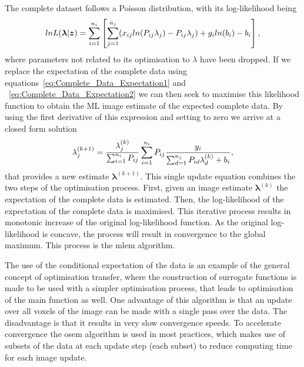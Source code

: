 The complete dataset follows a Poisson distribution, with its log-likelihood being
\begin{equation}
lnL(\bm{\lambda}|\bm{z}) = 
\sum_{i=1}^{n_i} \left[\sum_{j=1}^{n_j}( x_{ij} ln(P_{ij}\lambda_j) - P_{ij} \lambda_j) +
g_i ln(b_i) - b_i \right] \\ ,  
\label{eqn:log_likelihood_z}
\end{equation}
where parameters not related to its optimisation to $\lambda$ have been dropped. 
If we replace the expectation of the complete data using equations~\ref{eq:Complete_Data_Expectation1} and ~\ref{eq:Complete_Data_Expectation2} we can then seek to maximise this likelihood function to obtain the ML image estimate of the expected complete data. By using the first derivative of this expression and setting to zero we arrive at a closed form solution
\begin{equation}
\lambda_j^{(k+1)} = \frac{\lambda_j^{(k)}}{\sum_{i=1}^{n_i} P_{ij}} 
\sum_{i=1}^{n_i} P_{ij} 
\frac{y_i}{\sum_{d=1}^{n_j} P_{id}\lambda_d^{(k)} + b_i } \\,
\label{eqn:MLEM}
\end{equation} 
that provides a new estimate $\bm{\lambda}^{(k+1)}$. This single update equation combines the two steps of the optimisation process. First, given an image estimate $\bm{\lambda}^{(k)}$ the expectation of the complete data is estimated. Then, the log-likelihood of the expectation of the complete data is maximised. This iterative process results in monotonic increase of the original log-likelihood function. As the original log-likelihood is concave, the process will result in convergence to the global maximum.
This process is the \gls{mlem} algorithm.

The use of the conditional expectation of the data is an example of the general concept of optimisation transfer, where the construction of surrogate functions is made to be used with a simpler optimisation process, that leads to optimisation of the main function as well. One advantage of this algorithm is that an update over all voxels of the image can be made with a single pass over the data. The disadvantage is that it results in very slow convergence speeds. 
To accelerate convergence the \gls{osem} algorithm is used in most practices, which makes use of subsets of the data at each update step (each subset) to reduce computing time for each image update. 

